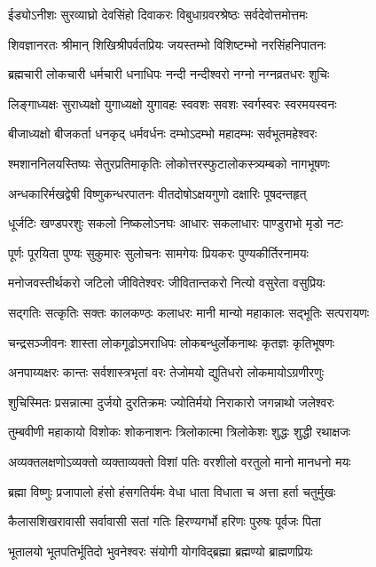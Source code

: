 \twolineshloka
{ईड्योऽनीशः सुरव्याघ्रो देवसिंहो दिवाकरः}
{विबुधाग्रवरश्रेष्ठः सर्वदेवोत्तमोत्तमः}

\twolineshloka
{शिवज्ञानरतः श्रीमान् शिखिश्रीपर्वतप्रियः}
{जयस्तम्भो विशिष्टम्भो नरसिंहनिपातनः}

\twolineshloka
{ब्रह्मचारी लोकचारी धर्मचारी धनाधिपः}
{नन्दी नन्दीश्वरो नग्नो नग्नव्रतधरः शुचिः}

\twolineshloka
{लिङ्गाध्यक्षः सुराध्यक्षो युगाध्यक्षो युगावहः}
{स्ववशः सवशः स्वर्गस्वरः स्वरमयस्वनः}

\twolineshloka
{बीजाध्यक्षो बीजकर्ता धनकृद् धर्मवर्धनः}
{दम्भोऽदम्भो महादम्भः सर्वभूतमहेश्वरः}

\twolineshloka
{श्मशाननिलयस्तिष्यः सेतुरप्रतिमाकृतिः}
{लोकोत्तरस्फुटालोकस्त्र्यम्बको नागभूषणः}

\twolineshloka
{अन्धकारिर्मखद्वेषी विष्णुकन्धरपातनः}
{वीतदोषोऽक्षयगुणो दक्षारिः पूषदन्तहृत्}

\twolineshloka
{धूर्जटिः खण्डपरशुः सकलो निष्कलोऽनघः}
{आधारः सकलाधारः पाण्डुराभो मृडो नटः}

\twolineshloka
{पूर्णः पूरयिता पुण्यः सुकुमारः सुलोचनः}
{सामगेयः प्रियकरः पुण्यकीर्तिरनामयः}

\twolineshloka
{मनोजवस्तीर्थकरो जटिलो जीवितेश्वरः}
{जीवितान्तकरो नित्यो वसुरेता वसुप्रियः}

\twolineshloka
{सद्गतिः सत्कृतिः सक्तः कालकण्ठः कलाधरः}
{मानी मान्यो महाकालः सद्भूतिः सत्परायणः}

\twolineshloka
{चन्द्रसञ्जीवनः शास्ता लोकगूढोऽमराधिपः}
{लोकबन्धुर्लोकनाथः कृतज्ञः कृतिभूषणः}

\twolineshloka
{अनपाय्यक्षरः कान्तः सर्वशास्त्रभृतां वरः}
{तेजोमयो द्युतिधरो लोकमायोऽग्रणीरणुः}

\twolineshloka
{शुचिस्मितः प्रसन्नात्मा दुर्जयो दुरतिक्रमः}
{ज्योतिर्मयो निराकारो जगन्नाथो जलेश्वरः}

\twolineshloka
{तुम्बवीणी महाकायो विशोकः शोकनाशनः}
{त्रिलोकात्मा त्रिलोकेशः शुद्धः शुद्धी रथाक्षजः}

\twolineshloka
{अव्यक्तलक्षणोऽव्यक्तो व्यक्ताव्यक्तो विशां पतिः}
{वरशीलो वरतुलो मानो मानधनो मयः}

\twolineshloka
{ब्रह्मा विष्णुः प्रजापालो हंसो हंसगतिर्यमः}
{वेधा धाता विधाता च अत्ता हर्ता चतुर्मुखः}

\twolineshloka
{कैलासशिखरावासी सर्वावासी सतां गतिः}
{हिरण्यगर्भो हरिणः पुरुषः पूर्वजः पिता}

\twolineshloka
{भूतालयो भूतपतिर्भूतिदो भुवनेश्वरः}
{संयोगी योगविद्ब्रह्मा ब्रह्मण्यो ब्राह्मणप्रियः}

